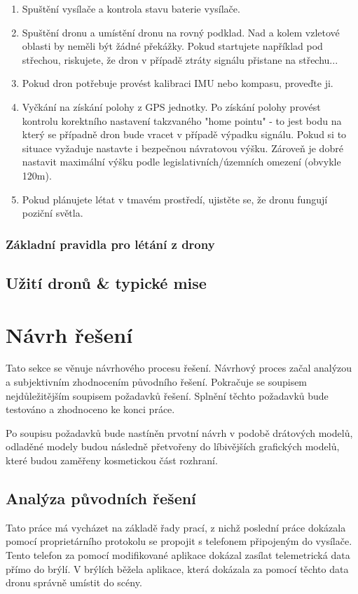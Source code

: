 \begin{enumerate}
    \item Spuštění vysílače a kontrola stavu baterie vysílače.
    \item Spuštění dronu a umístění dronu na rovný podklad. Nad a kolem vzletové oblasti by neměli být žádné překážky. Pokud startujete například pod střechou, riskujete, že dron v případě ztráty signálu přistane na střechu...
    \item Pokud dron potřebuje provést kalibraci IMU nebo kompasu, proveďte ji.
    \item Vyčkání na získání polohy z GPS jednotky. Po získání polohy provést kontrolu korektního nastavení takzvaného "home pointu" - to jest bodu na který se případně dron bude vracet v případě výpadku signálu. Pokud si to situace vyžaduje nastavte i bezpečnou návratovou výšku. Zároveň je dobré nastavit maximální výšku podle legislativních/územních omezení (obvykle 120m).
    \item Pokud plánujete létat v tmavém prostředí, ujistěte se, že dronu fungují poziční světla. 
    
\end{enumerate}
\subsection{Základní pravidla pro létání z drony}
\newpage
\section{Užití dronů \& typické mise}


\chapter{Návrh řešení}
Tato sekce se věnuje návrhového procesu řešení. Návrhový proces začal analýzou a subjektivním zhodnocením původního řešení. Pokračuje se soupisem nejdůležitějším soupisem požadavků řešení. Splnění těchto požadavků bude testováno a zhodnoceno ke konci práce.

Po soupisu požadavků bude nastíněn prvotní návrh v podobě drátových modelů, odladěné modely budou následně přetvořeny do líbivějších grafických modelů, které budou zaměřeny kosmetickou část rozhraní.
\section{Analýza původních řešení}
Tato práce má vycházet na základě řady prací, z nichž poslední práce \cite{KyjacMartin2022Vnpp} dokázala pomocí proprietárního protokolu se propojit s telefonem připojeným do vysílače. Tento telefon za pomocí modifikované aplikace dokázal zasílat telemetrická data přímo do brýlí. V brýlích běžela aplikace, která dokázala za pomocí těchto data dronu správně umístit do scény. 

